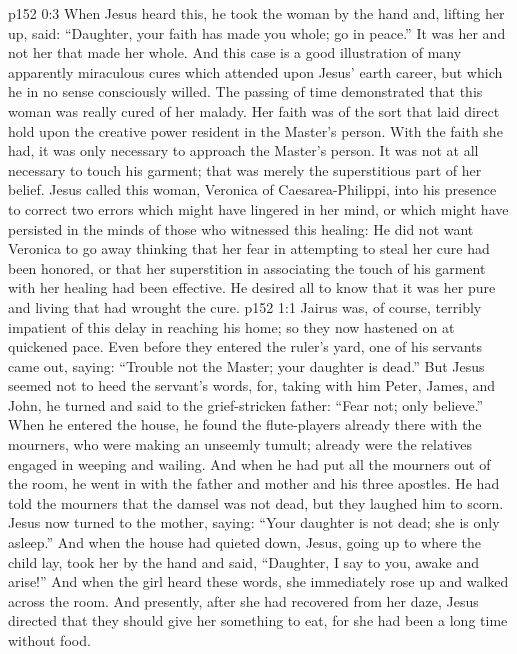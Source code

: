 \vs p152 0:3 When Jesus heard this, he took the woman by the hand and, lifting her up, said: \textcolor{ubdarkred}{“Daughter, your faith has made you whole; go in peace.”} It was her  and not her  that made her whole. And this case is a good illustration of many apparently miraculous cures which attended upon Jesus’ earth career, but which he in no sense consciously willed. The passing of time demonstrated that this woman was really cured of her malady. Her faith was of the sort that laid direct hold upon the creative power resident in the Master’s person. With the faith she had, it was only necessary to approach the Master’s person. It was not at all necessary to touch his garment; that was merely the superstitious part of her belief. Jesus called this woman, Veronica of Caesarea\hyp{}Philippi, into his presence to correct two errors which might have lingered in her mind, or which might have persisted in the minds of those who witnessed this healing: He did not want Veronica to go away thinking that her fear in attempting to steal her cure had been honored, or that her superstition in associating the touch of his garment with her healing had been effective. He desired all to know that it was her pure and living  that had wrought the cure.
\vs p152 1:1 Jairus was, of course, terribly impatient of this delay in reaching his home; so they now hastened on at quickened pace. Even before they entered the ruler’s yard, one of his servants came out, saying: “Trouble not the Master; your daughter is dead.” But Jesus seemed not to heed the servant’s words, for, taking with him Peter, James, and John, he turned and said to the grief\hyp{}stricken father: \textcolor{ubdarkred}{“Fear not; only believe.”} When he entered the house, he found the flute\hyp{}players already there with the mourners, who were making an unseemly tumult; already were the relatives engaged in weeping and wailing. And when he had put all the mourners out of the room, he went in with the father and mother and his three apostles. He had told the mourners that the damsel was not dead, but they laughed him to scorn. Jesus now turned to the mother, saying: \textcolor{ubdarkred}{“Your daughter is not dead; she is only asleep.”} And when the house had quieted down, Jesus, going up to where the child lay, took her by the hand and said, \textcolor{ubdarkred}{“Daughter, I say to you, awake and arise!”} And when the girl heard these words, she immediately rose up and walked across the room. And presently, after she had recovered from her daze, Jesus directed that they should give her something to eat, for she had been a long time without food.\plusone

